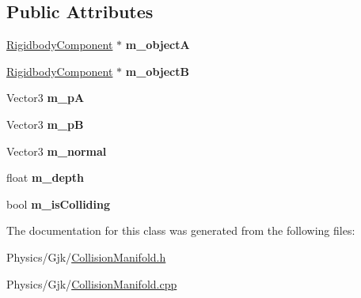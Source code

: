 \subsection*{Public Attributes}
\begin{DoxyCompactItemize}
\item 
\mbox{\label{classCollisionManifold_acc19a876530a865b75ed5c347aed8e16}} 
\hyperlink{classRigidbodyComponent}{Rigidbody\+Component} $\ast$ {\bfseries m\+\_\+objectA}
\item 
\mbox{\label{classCollisionManifold_a9687be8c297bde4d747befda177afbb6}} 
\hyperlink{classRigidbodyComponent}{Rigidbody\+Component} $\ast$ {\bfseries m\+\_\+objectB}
\item 
\mbox{\label{classCollisionManifold_aa6bee4bd56bf5cf54993eb68ae8e8a80}} 
Vector3 {\bfseries m\+\_\+pA}
\item 
\mbox{\label{classCollisionManifold_a99023627d612e6adf5d250332e8a5ea4}} 
Vector3 {\bfseries m\+\_\+pB}
\item 
\mbox{\label{classCollisionManifold_a0e49d92c5442e191fc72081c4000657e}} 
Vector3 {\bfseries m\+\_\+normal}
\item 
\mbox{\label{classCollisionManifold_a147ed5dd2971186308764d5faa640219}} 
float {\bfseries m\+\_\+depth}
\item 
\mbox{\label{classCollisionManifold_af352403a375481087f37f0e3a463d82f}} 
bool {\bfseries m\+\_\+is\+Colliding}
\end{DoxyCompactItemize}


The documentation for this class was generated from the following files\+:\begin{DoxyCompactItemize}
\item 
Physics/\+Gjk/\hyperlink{CollisionManifold_8h}{Collision\+Manifold.\+h}\item 
Physics/\+Gjk/\hyperlink{CollisionManifold_8cpp}{Collision\+Manifold.\+cpp}\end{DoxyCompactItemize}
